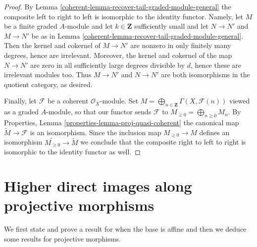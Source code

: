 \begin{proof}
\medskip\noindent
By Lemma \ref{coherent-lemma-recover-tail-graded-module-general}
the composite left to right to left is isomorphic to the identity functor.
Namely, let $M$ be a finite graded $A$-module and let
$k \in \mathbf{Z}$ sufficiently small and let
$N \to N'$ and $M \to N'$ be as in
Lemma \ref{coherent-lemma-recover-tail-graded-module-general}.
Then the kernel and cokernel of $M \to N'$ are nonzero in
only finitely many degrees, hence are irrelevant. Moreover, the
kernel and cokernel of the map $N \to N'$ are zero in all sufficiently
large degrees divisible by $d$, hence these are irrelevant modules too.
Thus $M \to N'$ and $N \to N'$ are both isomorphisms in the quotient
category, as desired.

\medskip\noindent
Finally, let $\mathcal{F}$ be a coherent $\mathcal{O}_X$-module.
Set $M = \bigoplus_{n \in \mathbf{Z}} \Gamma(X, \mathcal{F}(n))$
viewed as a graded $A$-module, so that our functor sends $\mathcal{F}$ to
$M_{\geq 0} = \bigoplus_{n \geq 0} M_n$.
By Properties, Lemma \ref{properties-lemma-proj-quasi-coherent}
the canonical map $\widetilde M \to \mathcal{F}$
is an isomorphism. Since the inclusion map
$M_{\geq 0} \to M$ defines an isomorphism
$\widetilde{M_{\geq 0}} \to \widetilde M$ we conclude that
the composite right to left to right is isomorphic to the identity
functor as well.
\end{proof}

\section{Higher direct images along projective morphisms}
\label{coherent-section-projective-pushforward}
We first state and prove a result for when the base is affine
and then we deduce some results for projective morphisms.

